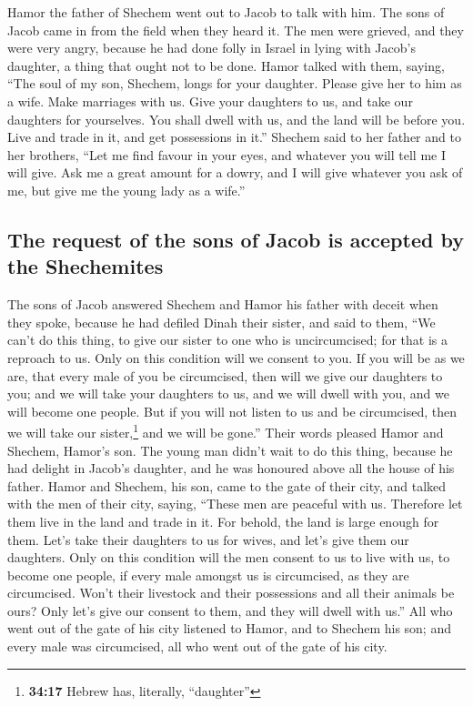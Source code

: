  Hamor the father of Shechem went out to Jacob to talk
with him.  The sons of Jacob came in from the field when
they heard it. The men were grieved, and they were very angry, because
he had done folly in Israel in lying with Jacob's daughter, a thing that
ought not to be done.  Hamor talked with them, saying,
``The soul of my son, Shechem, longs for your daughter. Please give her
to him as a wife.  Make marriages with us. Give your
daughters to us, and take our daughters for yourselves. 
You shall dwell with us, and the land will be before you. Live and trade
in it, and get possessions in it.''  Shechem said to her
father and to her brothers, ``Let me find favour in your eyes, and
whatever you will tell me I will give.  Ask me a great
amount for a dowry, and I will give whatever you ask of me, but give me
the young lady as a wife.''

\hypertarget{the-request-of-the-sons-of-jacob-is-accepted-by-the-shechemites}{%
\subsection{The request of the sons of Jacob is accepted by the
Shechemites}\label{the-request-of-the-sons-of-jacob-is-accepted-by-the-shechemites}}

 The sons of Jacob answered Shechem and Hamor his father
with deceit when they spoke, because he had defiled Dinah their sister,
 and said to them, ``We can't do this thing, to give our
sister to one who is uncircumcised; for that is a reproach to us.
 Only on this condition will we consent to you. If you
will be as we are, that every male of you be circumcised,
 then will we give our daughters to you; and we will take
your daughters to us, and we will dwell with you, and we will become one
people.  But if you will not listen to us and be
circumcised, then we will take our sister,\footnote{\textbf{34:17}
  Hebrew has, literally, ``daughter''} and we will be gone.''
 Their words pleased Hamor and Shechem, Hamor's son.
 The young man didn't wait to do this thing, because he
had delight in Jacob's daughter, and he was honoured above all the house
of his father.  Hamor and Shechem, his son, came to the
gate of their city, and talked with the men of their city, saying,
 ``These men are peaceful with us. Therefore let them
live in the land and trade in it. For behold, the land is large enough
for them. Let's take their daughters to us for wives, and let's give
them our daughters.  Only on this condition will the men
consent to us to live with us, to become one people, if every male
amongst us is circumcised, as they are circumcised. 
Won't their livestock and their possessions and all their animals be
ours? Only let's give our consent to them, and they will dwell with
us.''  All who went out of the gate of his city listened
to Hamor, and to Shechem his son; and every male was circumcised, all
who went out of the gate of his city.

